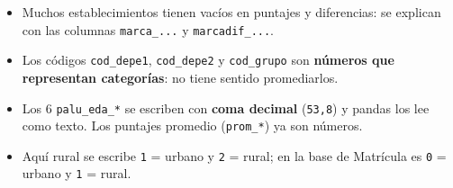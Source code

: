 \documentclass[10.5pt]{article}
\begin{document}
\begin{alertabox}
\begin{itemize}[leftmargin=1.1em,itemsep=2pt,topsep=2pt]
\item Muchos establecimientos tienen vacíos en puntajes y diferencias: se explican con las columnas \texttt{marca\_\allowbreak{}...} y \texttt{marcadif\_\allowbreak{}...}.
\item Los códigos \texttt{cod\_\allowbreak{}depe1}, \texttt{cod\_\allowbreak{}depe2} y \texttt{cod\_\allowbreak{}grupo} son \textbf{números que representan categorías}: no tiene sentido promediarlos.
\item Los 6 \texttt{palu\_\allowbreak{}eda\_\allowbreak{}*} se escriben con \textbf{coma decimal} (\texttt{53,8}) y pandas los lee como texto. Los puntajes promedio (\texttt{prom\_\allowbreak{}*}) ya son números.
\item Aquí rural se escribe \texttt{1} = urbano y \texttt{2} = rural; en la base de Matrícula es \texttt{0} = urbano y \texttt{1} = rural.
\end{itemize}
\end{alertabox}

\newpage
{}\label{base4}\hypertarget{base4}{}
\end{document}

